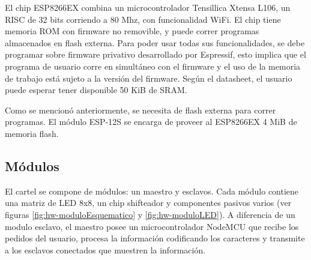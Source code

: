 El chip ESP8266EX combina un microcontrolador Tensillica Xtensa L106, un RISC de 32 bits corriendo a 80 Mhz, con funcionalidad WiFi. \cite{ESP8266Datasheet} El chip tiene memoria ROM con firmware no removible, y puede correr programas almacenados en flash externa. Para poder usar todas sus funcionalidades, se debe programar sobre firmware privativo desarrollado por Espressif, esto implica que el programa de usuario corre en simultáneo con el firmware y el uso de la memoria de trabajo está sujeto a la versión del firmware. Según el datasheet, el usuario puede esperar tener disponible 50 KiB de SRAM.

Como se mencionó anteriormente, se necesita de flash externa para correr programas. El módulo ESP-12S se encarga de proveer al ESP8266EX 4 MiB de memoria flash.

\subsection{Módulos}
El cartel se compone de módulos: un maestro y esclavos. Cada módulo contiene una matriz de LED 8x8, un chip shifteador \cite{MAX7219} y componentes pasivos varios (ver figuras \ref{fig:hw-moduloEsquematico} y \ref{fig:hw-moduloLED}). A diferencia de un modulo esclavo, el maestro posee un microcontrolador NodeMCU que recibe los pedidos del usuario, procesa la información codificando los caracteres y transmite a los esclavos conectados que muestren la información.

